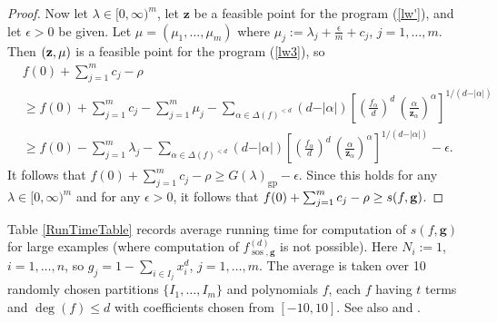 \documentclass{amsart}
\theoremstyle{definition}
\begin{document}
\begin{proof}
Now let $\lambda \in [0,\infty)^m$, let $\mathbf{z}$ be a feasible point for the program (\ref{lw'}), and let $\epsilon>0$ be given.
Let $\mu = (\mu_1,\dots,\mu_m)$ where $\mu_j:= \lambda_j+\frac{\epsilon}{m}+c_j$, $j=1,\dots,m$.
Then $({\bf z}, \mu)$ is a feasible point for the program (\ref{lw3}), so
%
\begin{align*}
	& f(0)+\sum_{j=1}^m c_j -\rho \\ & \ge f(0)+\sum_{j=1}^m c_j- \sum_{j=1}^m \mu_j  -  \sum\limits_{\alpha\in\Delta(f)^{<d}}(d-\vert\alpha\vert)\left[
	 \left(\frac{f_\alpha}{d}\right)^{d}\,\left(\frac{\alpha}{\mathbf{z}_\alpha}\right)^\alpha
	\right]^{1/(d-\vert\alpha\vert)} \\
	 & \ge f(0)-  \sum_{j=1}^m \lambda_j-\sum\limits_{\alpha\in\Delta(f)^{<d}}(d-\vert\alpha\vert)\left[
	 \left(\frac{f_\alpha}{d}\right)^{d}\,\left(\frac{\alpha}{\mathbf{z}_\alpha}\right)^\alpha
	\right]^{1/(d-\vert\alpha\vert)} - \epsilon.
\end{align*}
%
It follows that $f(0)+\sum_{j=1}^m c_j -\rho \ge  G(\lambda)_{\operatorname{gp}}-\epsilon$. Since this holds for any $\lambda \in [0,\infty)^m$ and for any $\epsilon>0$, it follows that $f(0)+\sum_{j=1}^m c_j -\rho \ge s(f, {\bf g})$.
\end{proof}

Table \ref{RunTimeTable} records average running time for computation of $s(f,\mathbf{g})$ for large examples (where computation of $f_{\operatorname{sos},\mathbf{g}}^{(d)}$ is not possible). Here $N_i :=1$, $i = 1,\dots,n$, so $g_j = 1 - \sum_{i\in I_j} x_i^d$, $j=1,\dots,m$. The average is taken over 10 randomly chosen partitions $\{I_1,\dots,I_m\}$ and polynomials $f$, each $f$ having $t$ terms and $\deg(f)\le d$ with coefficients chosen from $[-10,10]$. See also \cite[Table 2]{gha-lass-mar} and \cite[Table 3]{gha-mar2}.
\end{document}
